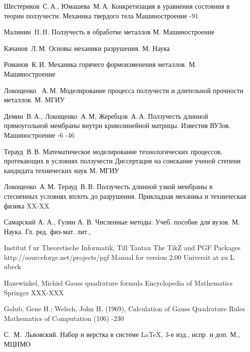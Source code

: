 \renewcommand{\bibname}{Список источников}
\begin{thebibliography}{2013}
\label{shest}
\by Шестериков~С.\,А., Юмашева~М.\,А.
\paper Конкретизация в уравнения состояния в теории ползучести.
\jour Механика твердого тела
\publ Машиностроение
-91


\label{malinin}
\by Малинин~H.\,H.
\book Ползучесть в обработке металлов
\publaddr М.
\publ Машиностроение

\label{kachanov}
\by Качанов~Л.\,М.
\book Основы механики разрушения.
\publaddr М.
\publ Наука

\label{romanov}
\by Романов~К.\,И.
\book Механика горячего формоизменения металлов.
\publaddr М.
\publ Машиностроение


\label{lokoschenko}
\by Локощенко	~А.\,М.
\book Моделирование процесса ползучести и длительной прочности металлов.
\publaddr М.
\publ МГИУ

\label{jerebcov}
	\by Демин~В.\,А., Локощенко~А.\,М, Жеребцов~А.\,А. 
	\paper Ползучесть длинной прямоугольной мембраны внутри криволинейной матрицы. 
	\jour Известия ВУЗов. Машиностроение
	-6
	-46

	
\label{teraud_dis}
	\by Терауд~В.\,В.
	\book Математическое моделирование технологических процессов, протекающих в условиях ползучести
	\publ Диссертация на соискание ученой степени кандидата технических наук
	\publaddr М. МГИУ

\label{teraud}
	\by Локощенко~А.\,М. Терауд~В.\,В. 
	\paper Ползучесть длинной узкой мембраны в стесненных условиях вплоть до разрушения.
	\jour Прикладная механика и техническая физика	
	\pages XX-XX

  \label{samarskiy} 
\by Самарский А. А., Гулин А. В. 
\book Численные методы: Учеб. пособие для вузов.
\publaddr М. Наука. Гл. ред. физ-мат. лит.,

\label{tikz-manual}
 \by Institut f ur Theoretische Informatik, Till Tantau
 \book The TikZ and PGF Packages http://sourceforge.net/projects/pgf Manual for version 2.00
 \publ Universit at zu L ubeck

\label{gauss_book}
 \by Hazewinkel, Michiel
 \paper Gauss quadrature formula
 \jour Encyclopedia of Mathematics
 \publaddr Springer
 \pages XXX-XXX
 
\label{gauss_article}
  \by Golub, Gene H.; Welsch, John H. (1969), 
  \paper Calculation of Gauss Quadrature Rules
  \jour Mathematics of Computation
   (106)
  -230

\by С.~М.~Львовский.
\book Набор и верстка в системе \LaTeX, 3-е изд., испр. и доп.
\publaddr М., МЦНМО

\end{thebibliography}

\endinput
